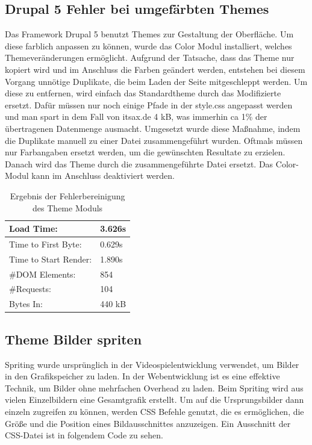 
\subsection{Drupal 5 Fehler bei umgefärbten Themes}
Das Framework Drupal 5 benutzt Themes zur Gestaltung der Oberfläche. Um diese farblich anpassen zu können, wurde das Color Modul installiert, welches Themeveränderungen ermöglicht. Aufgrund der Tatsache, dass das Theme nur kopiert wird und im Anschluss die Farben geändert werden, entstehen bei diesem Vorgang unnötige Duplikate, die beim Laden der Seite mitgeschleppt werden. Um diese zu entfernen, wird einfach das Standardtheme durch das Modifizierte ersetzt. Dafür müssen  nur noch einige Pfade in der style.css angepasst werden und man spart in dem Fall von itsax.de 4 kB, was immerhin ca 1\% der übertragenen Datenmenge ausmacht. Umgesetzt wurde diese Ma\ss{}nahme, indem die Duplikate manuell zu einer Datei zusammengef\"uhrt wurden. Oftmals m\"ussen nur Farbangaben ersetzt werden, um die gew\"unschten Resultate zu erzielen. Danach wird das Theme durch die zusammengef\"uhrte Datei ersetzt. Das Color-Modul kann im Anschluss deaktiviert werden.

\begin{table}[!ht]
\centering
\caption{Ergebnis der Fehlerbereinigung des Theme Moduls}
    \begin{tabular}{ | p{3cm} | p{1.5cm} | }
    \hline
    Load Time: 			& 3.626s 	\\ \hline
    Time to First Byte:		& 0.629s  	\\ \hline
    Time to Start Render:	& 1.890s	\\ \hline
    \#DOM Elements:		& 854 		\\ \hline
    \#Requests:			& 104 		\\ \hline
    Bytes In:			& 440 kB 	\\ \hline
    \hline
    \end{tabular}
\end{table}

\subsection{Theme Bilder spriten}
Spriting wurde ursprünglich in der Videospielentwicklung verwendet, um Bilder in den Grafikspeicher zu laden. In der Webentwicklung ist es eine effektive Technik, um Bilder ohne mehrfachen Overhead zu laden. Beim Spriting wird aus vielen Einzelbildern eine Gesamtgrafik erstellt. Um auf die Ursprungsbilder dann einzeln zugreifen zu können, werden CSS Befehle genutzt, die es ermöglichen, die Größe und die Position eines Bildausschnittes anzuzeigen. Ein Ausschnitt der CSS-Datei ist in folgendem Code zu sehen.


